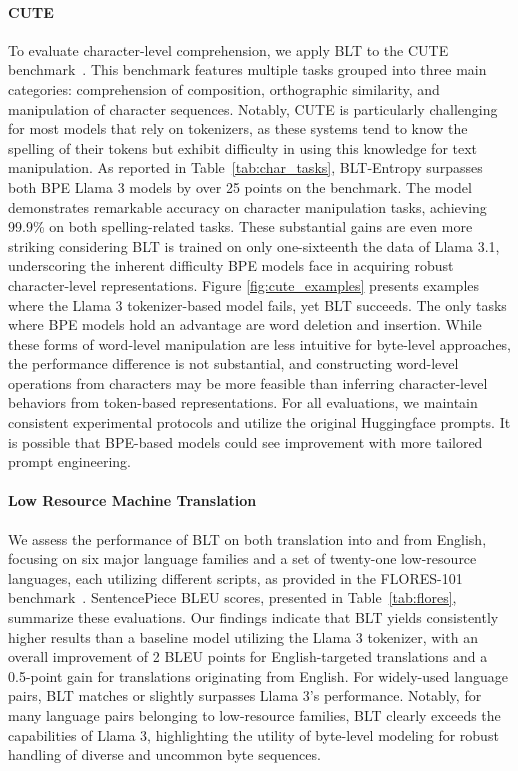 \paragraph{CUTE}
To evaluate character-level comprehension, we apply {\textsc BLT} to the CUTE benchmark~\citep{edman2024cute}. This benchmark features multiple tasks grouped into three main categories: comprehension of composition, orthographic similarity, and manipulation of character sequences. Notably, CUTE is particularly challenging for most models that rely on tokenizers, as these systems tend to know the spelling of their tokens but exhibit difficulty in using this knowledge for text manipulation. As reported in Table~\ref{tab:char_tasks}, {\textsc BLT}-Entropy surpasses both BPE Llama 3 models by over 25 points on the benchmark. The model demonstrates remarkable accuracy on character manipulation tasks, achieving 99.9\% on both spelling-related tasks. These substantial gains are even more striking considering {\textsc BLT} is trained on only one-sixteenth the data of Llama 3.1, underscoring the inherent difficulty BPE models face in acquiring robust character-level representations. Figure \ref{fig:cute_examples} presents examples where the Llama 3 tokenizer-based model fails, yet {\textsc BLT} succeeds. The only tasks where BPE models hold an advantage are word deletion and insertion. While these forms of word-level manipulation are less intuitive for byte-level approaches, the performance difference is not substantial, and constructing word-level operations from characters may be more feasible than inferring character-level behaviors from token-based representations. For all evaluations, we maintain consistent experimental protocols and utilize the original Huggingface prompts. It is possible that BPE-based models could see improvement with more tailored prompt engineering.

\paragraph{Low Resource Machine Translation} We assess the performance of {\textsc BLT} on both translation into and from English, focusing on six major language families and a set of twenty-one low-resource languages, each utilizing different scripts, as provided in the FLORES-101 benchmark~\citep{goyal2022flores}. SentencePiece BLEU scores, presented in Table~\ref{tab:flores}, summarize these evaluations. Our findings indicate that {\textsc BLT} yields consistently higher results than a baseline model utilizing the Llama 3 tokenizer, with an overall improvement of 2 BLEU points for English-targeted translations and a 0.5-point gain for translations originating from English. For widely-used language pairs, {\textsc BLT} matches or slightly surpasses Llama 3’s performance. Notably, for many language pairs belonging to low-resource families, {\textsc BLT} clearly exceeds the capabilities of Llama 3, highlighting the utility of byte-level modeling for robust handling of diverse and uncommon byte sequences.

